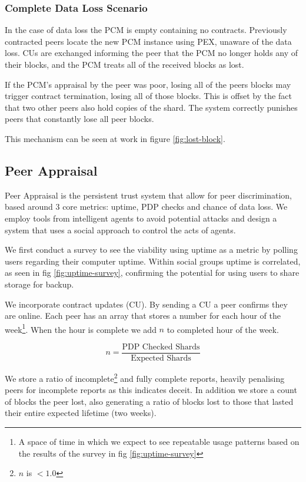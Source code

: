 \documentclass[11pt, a4paper, twoside]{report}
\begin{document}
\subsubsection{Complete Data Loss Scenario}

In the case of data loss the PCM is empty containing no contracts. Previously contracted peers locate the new PCM instance using PEX, unaware of the data loss. CUs are exchanged informing the peer that the PCM no longer holds any of their blocks, and the PCM treats all of the received blocks as lost.

If the PCM's appraisal by the peer was poor, losing all of the peers blocks may trigger contract termination, losing all of those blocks. This is offset by the fact that two other peers also hold copies of the shard. The system correctly punishes peers that constantly lose all peer blocks.

This mechanism can be seen at work in figure \ref{fig:lost-block}.

\subsection{Peer Appraisal} \label{sec:peerAppraisal}

Peer Appraisal is the persistent trust system that allow for peer discrimination, based around 3 core metrics: uptime, PDP checks and chance of data loss. We employ tools from intelligent agents to avoid potential attacks and design a system that uses a social approach \citep{pinyol2013computational} to control the acts of agents.

We first conduct a survey to see the viability using uptime as a metric by polling users regarding their computer uptime. Within social groups uptime is correlated, as seen in fig \ref{fig:uptime-survey}, confirming the potential for using users to share storage for backup.

We incorporate contract updates (CU). By sending a CU a peer confirms they are online. Each peer has an array that stores a number for each hour of the week\footnote{A space of time in which we expect to see repeatable usage patterns based on the results of the survey in fig \ref{fig:uptime-survey}}. When the hour is complete we add $n$ to completed hour of the week.

$$n = \frac{\mbox{PDP Checked Shards}}{\mbox{Expected Shards}}$$

We store a ratio of incomplete\footnote{$n$ is $<1.0$} and fully complete reports, heavily penalising peers for incomplete reports as this indicates deceit. In addition we store a count of blocks the peer lost, also generating a ratio of blocks lost to those that lasted their entire expected lifetime (two weeks).
\end{document}
